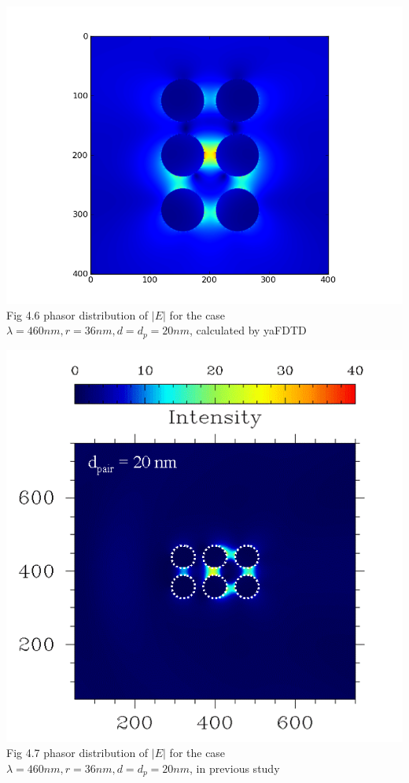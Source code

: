 \documentclass[openany]{book}
\begin{document}
\begin{center}
\includegraphics[scale=0.8]{images/etotal.png}\\
Fig 4.6
phasor distribution of $|E|$ for the case $\lambda = 460nm, r = 36nm, d = d_p = 20nm$, calculated by yaFDTD
\end{center}
\begin{center}
\includegraphics[scale=0.5]{images/r36.png}\\
Fig 4.7
phasor distribution of $|E|$ for the case $\lambda = 460nm, r = 36nm, d = d_p = 20nm$, in previous study
\end{center}
\end{document}
